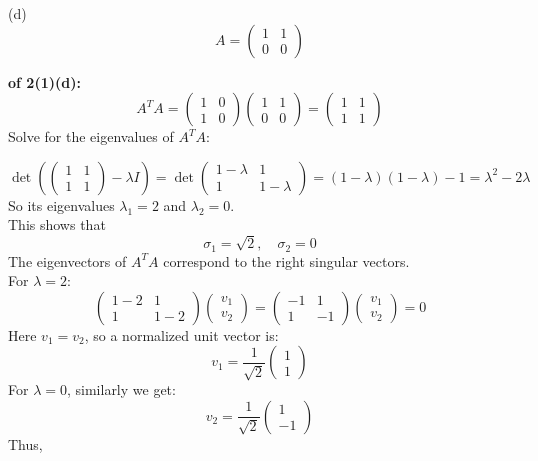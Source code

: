 \documentclass[lang=cn,11pt]{elegantbook}
\begin{document}
(d) $$A = \begin{pmatrix}1 & 1\\[3pt]0 & 0\end{pmatrix}$$
\begin{solution}\textbf{ of 2(1)(d):}\\
\[
A^T A = \begin{pmatrix}1 & 0\\1 & 0\end{pmatrix} \begin{pmatrix}1 & 1\\0 & 0\end{pmatrix}
= \begin{pmatrix}1 & 1\\1 & 1\end{pmatrix}
\]
Solve for the eigenvalues of \( A^T A \):

\[
\det\left( \begin{pmatrix}1 & 1\\1 & 1\end{pmatrix} - \lambda I \right) = \det\begin{pmatrix}1-\lambda & 1\\1 & 1-\lambda\end{pmatrix} = (1-\lambda)(1-\lambda) - 1 = \lambda^2 - 2\lambda
\]
So its eigenvalues \( \lambda_1 = 2 \) and \( \lambda_2 = 0 \).\\
This shows that \[
\sigma_1 = \sqrt{2}, \quad \sigma_2 = 0
\]
The eigenvectors of \( A^T A \) correspond to the right singular vectors.\\
For \( \lambda = 2 \): \[
\begin{pmatrix}1 - 2 & 1 \\ 1 & 1 - 2\end{pmatrix} \begin{pmatrix}v_1 \\ v_2\end{pmatrix} = \begin{pmatrix}-1 & 1 \\ 1 & -1\end{pmatrix} \begin{pmatrix}v_1 \\ v_2\end{pmatrix} = 0
\]
Here \( v_1 = v_2 \), so a normalized unit vector is:
\[
v_1 = \frac{1}{\sqrt{2}} \begin{pmatrix}1 \\ 1\end{pmatrix}
\]
For \( \lambda = 0 \), similarly we get:
\[
v_2 = \frac{1}{\sqrt{2}} \begin{pmatrix}1 \\ -1\end{pmatrix}
\]
Thus,


\end{solution}
\end{document}
